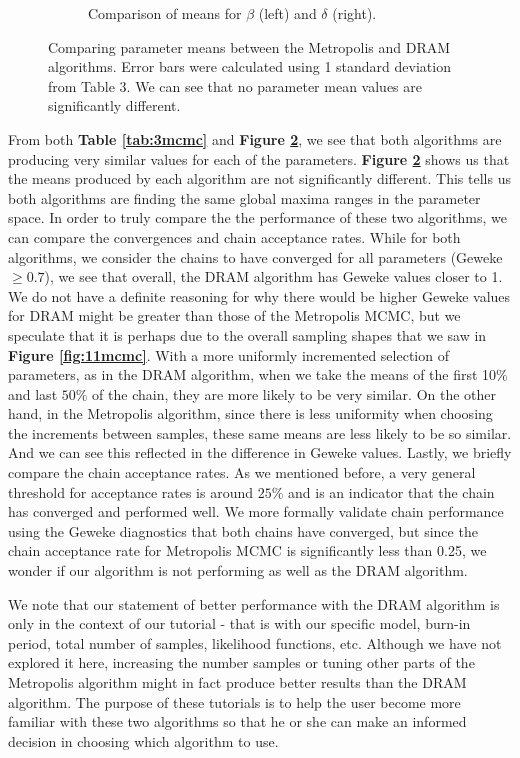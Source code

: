 \documentclass{article}
\begin{document}
\begin{figure}[H]
\begin{subfigure}{.5\textwidth}
  \caption{Comparison of means for $\beta$ (left) and $\delta$ (right).}
  \label{fig:12bmcmcm} 
\end{subfigure}
\caption{Comparing parameter means between the Metropolis and DRAM algorithms. Error bars were calculated using 1 standard deviation from Table 3. We can see that no parameter mean values are significantly different.}
\label{fig:12mcmc}
\end{figure}
From both \textbf{Table \ref{tab:3mcmc}} and \textbf{Figure \ref{fig:12mcmc}}, we see that both algorithms are producing very similar values for each of the parameters. \textbf{Figure \ref{fig:12mcmc}} shows us that the means produced by each algorithm are not significantly different. This tells us both algorithms are finding the same global maxima ranges in the parameter space. In order to truly compare the the performance of these two algorithms, we can compare the convergences and chain acceptance rates. While for both algorithms, we consider the chains to have converged for all parameters (Geweke $\geq 0.7$), we see that overall, the DRAM algorithm has Geweke values closer to 1. We do not have a definite reasoning for why there would be higher Geweke values for DRAM might be greater than those of the Metropolis MCMC, but we speculate that it is perhaps due to the overall sampling shapes that we saw in \textbf{Figure \ref{fig:11mcmc}}. With a more uniformly incremented selection of parameters, as in the DRAM algorithm, when we take the means of the first 10$\%$ and last $50\%$ of the chain, they are more likely to be very similar. On the other hand, in the Metropolis algorithm, since there is less uniformity when choosing the increments between samples, these same means are less likely to be so similar. And we can see this reflected in the difference in Geweke values. Lastly, we briefly compare the chain acceptance rates. As we mentioned before, a very general threshold for acceptance rates is around $25\%$ and is an indicator that the chain has converged and performed well. We more formally validate chain performance using the Geweke diagnostics that both chains have converged, but since the chain acceptance rate for Metropolis MCMC is significantly less than 0.25, we wonder if our algorithm is not performing as well as the DRAM algorithm.
\par We note that our statement of better performance with the DRAM algorithm is only in the context of our tutorial - that is with our specific model, burn-in period, total number of samples, likelihood functions, etc. Although we have not explored it here, increasing the number samples or tuning other parts of the Metropolis algorithm might in fact produce better results than the DRAM algorithm. The purpose of these tutorials is to help the user become more familiar with these two algorithms so that he or she can make an informed decision in choosing which algorithm to use.
\end{document}
